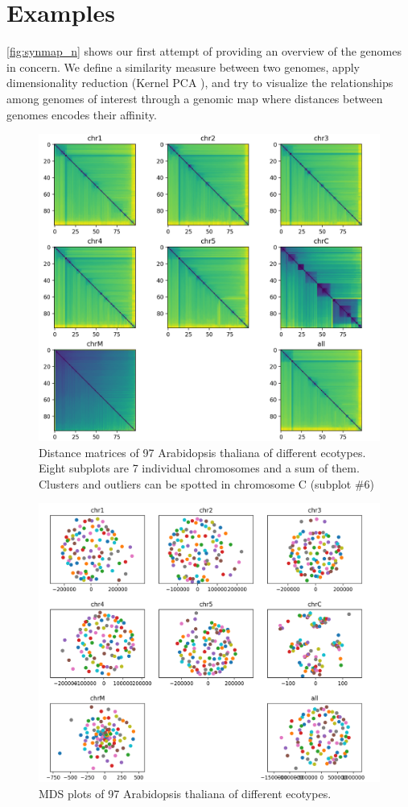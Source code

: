 \documentclass{vgtc}                      %
\begin{document}
\section{Examples}
\autoref{fig:synmap_n} shows our first attempt of providing an overview of the genomes in concern. We define a similarity measure between two genomes, apply dimensionality reduction (Kernel PCA \cite{kernelpca}), and try to visualize the relationships among genomes of interest through a genomic map where distances between genomes encodes their affinity.

\begin{figure}[th]
 \centering
 \includegraphics[width=0.8\columnwidth]{chromosomes_matrix}
 \caption{Distance matrices of 97 Arabidopsis thaliana of different ecotypes. Eight subplots are 7 individual chromosomes and a sum of them. Clusters and outliers can be spotted in chromosome C (subplot \#6)}
 \label{fig:chromosomes_matrix}
\end{figure}

\begin{figure}[th]
 \centering
 \includegraphics[width=0.8\columnwidth]{chromosomes_scatter}
 \caption{MDS plots of 97 Arabidopsis thaliana of different ecotypes.}
 \label{fig:chromosomes_scatter}
\end{figure}
\end{document}
